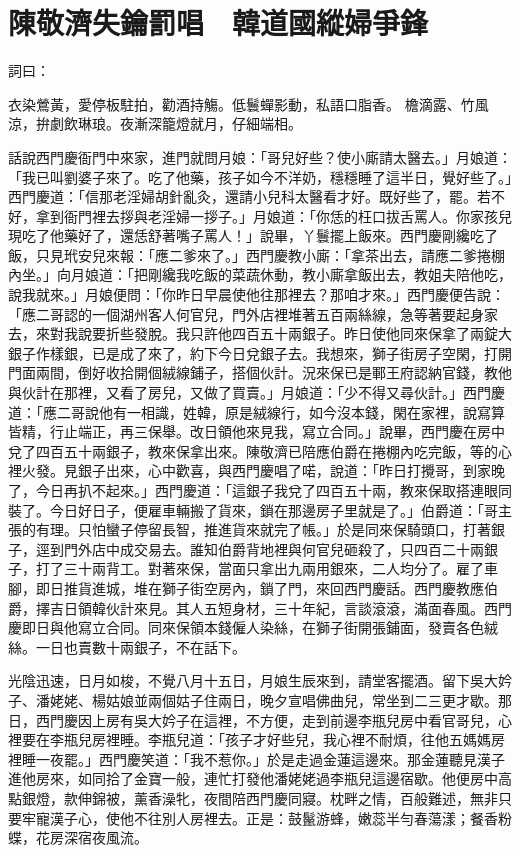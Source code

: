 %

\chapter{陳敬濟失鑰罰唱　韓道國縱婦爭鋒}

詞曰：

衣染鶯黃，愛停板駐拍，勸酒持觴。低鬟蟬影動，私語口脂香。 檐滴露、竹風涼，拚劇飲琳琅。夜漸深籠燈就月，仔細端相。

話說西門慶衙門中來家，進門就問月娘：「哥兒好些？使小廝請太醫去。」月娘道：「我已叫劉婆子來了。吃了他藥，孩子如今不洋奶，穩穩睡了這半日，覺好些了。」西門慶道：「信那老淫婦胡針亂灸，還請小兒科太醫看才好。既好些了，罷。若不好，拿到衙門裡去拶與老淫婦一拶子。」月娘道：「你恁的枉口拔舌罵人。你家孩兒現吃了他藥好了，還恁舒著嘴子罵人！」說畢，丫鬟擺上飯來。西門慶剛纔吃了飯，只見玳安兒來報：「應二爹來了。」西門慶教小廝：「拿茶出去，請應二爹捲棚內坐。」向月娘道：「把剛纔我吃飯的菜蔬休動，教小廝拿飯出去，教姐夫陪他吃，說我就來。」月娘便問：「你昨日早晨使他往那裡去？那咱才來。」西門慶便告說：「應二哥認的一個湖州客人何官兒，門外店裡堆著五百兩絲線，急等著要起身家去，來對我說要折些發脫。我只許他四百五十兩銀子。昨日使他同來保拿了兩錠大銀子作樣銀，已是成了來了，約下今日兌銀子去。我想來，獅子街房子空閑，打開門面兩間，倒好收拾開個絨線鋪子，搭個伙計。況來保已是鄆王府認納官錢，教他與伙計在那裡，又看了房兒，又做了買賣。」月娘道：「少不得又尋伙計。」西門慶道：「應二哥說他有一相識，姓韓，原是絨線行，如今沒本錢，閑在家裡，說寫算皆精，行止端正，再三保舉。改日領他來見我，寫立合同。」說畢，西門慶在房中兌了四百五十兩銀子，教來保拿出來。陳敬濟已陪應伯爵在捲棚內吃完飯，等的心裡火發。見銀子出來，心中歡喜，與西門慶唱了喏，說道：「昨日打攪哥，到家晚了，今日再扒不起來。」西門慶道：「這銀子我兌了四百五十兩，教來保取搭連眼同裝了。今日好日子，便雇車輛搬了貨來，鎖在那邊房子里就是了。」伯爵道：「哥主張的有理。只怕蠻子停留長智，推進貨來就完了帳。」於是同來保騎頭口，打著銀子，逕到門外店中成交易去。誰知伯爵背地裡與何官兒砸殺了，只四百二十兩銀子，打了三十兩背工。對著來保，當面只拿出九兩用銀來，二人均分了。雇了車腳，即日推貨進城，堆在獅子街空房內，鎖了門，來回西門慶話。西門慶教應伯爵，擇吉日領韓伙計來見。其人五短身材，三十年紀，言談滾滾，滿面春風。西門慶即日與他寫立合同。同來保領本錢僱人染絲，在獅子街開張鋪面，發賣各色絨絲。一日也賣數十兩銀子，不在話下。

光陰迅速，日月如梭，不覺八月十五日，月娘生辰來到，請堂客擺酒。留下吳大妗子、潘姥姥、楊姑娘並兩個姑子住兩日，晚夕宣唱佛曲兒，常坐到二三更才歇。那日，西門慶因上房有吳大妗子在這裡，不方便，走到前邊李瓶兒房中看官哥兒，心裡要在李瓶兒房裡睡。李瓶兒道：「孩子才好些兒，我心裡不耐煩，往他五媽媽房裡睡一夜罷。」西門慶笑道：「我不惹你。」於是走過金蓮這邊來。那金蓮聽見漢子進他房來，如同拾了金寶一般，連忙打發他潘姥姥過李瓶兒這邊宿歇。他便房中高點銀燈，款伸錦被，薰香澡牝，夜間陪西門慶同寢。枕畔之情，百般難述，無非只要牢寵漢子心，使他不往別人房裡去。正是：鼓鬣游蜂，嫩蕊半勻春蕩漾；餐香粉蝶，花房深宿夜風流。

